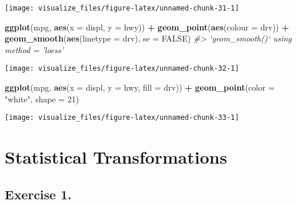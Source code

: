 \documentclass[]{book}
\newenvironment{Shaded}{\begin{snugshade}}{\end{snugshade}}
\newcommand{\CommentTok}[1]{\textcolor[rgb]{0.56,0.35,0.01}{\textit{#1}}}
\newcommand{\DataTypeTok}[1]{\textcolor[rgb]{0.13,0.29,0.53}{#1}}
\newcommand{\DecValTok}[1]{\textcolor[rgb]{0.00,0.00,0.81}{#1}}
\newcommand{\KeywordTok}[1]{\textcolor[rgb]{0.13,0.29,0.53}{\textbf{#1}}}
\newcommand{\NormalTok}[1]{#1}
\newcommand{\OperatorTok}[1]{\textcolor[rgb]{0.81,0.36,0.00}{\textbf{#1}}}
\newcommand{\OtherTok}[1]{\textcolor[rgb]{0.56,0.35,0.01}{#1}}
\newcommand{\StringTok}[1]{\textcolor[rgb]{0.31,0.60,0.02}{#1}}
\theoremstyle{definition}
\theoremstyle{definition}
\theoremstyle{definition}
\theoremstyle{remark}
\begin{document}
\begin{center}\texttt{[image: visualize\_files/figure-latex/unnamed-chunk-31-1]} \end{center}

\begin{Shaded}
\begin{Highlighting}[]
\KeywordTok{ggplot}\NormalTok{(mpg, }\KeywordTok{aes}\NormalTok{(}\DataTypeTok{x =}\NormalTok{ displ, }\DataTypeTok{y =}\NormalTok{ hwy)) }\OperatorTok{+}
\StringTok{  }\KeywordTok{geom_point}\NormalTok{(}\KeywordTok{aes}\NormalTok{(}\DataTypeTok{colour =}\NormalTok{ drv)) }\OperatorTok{+}
\StringTok{  }\KeywordTok{geom_smooth}\NormalTok{(}\KeywordTok{aes}\NormalTok{(}\DataTypeTok{linetype =}\NormalTok{ drv), }\DataTypeTok{se =} \OtherTok{FALSE}\NormalTok{)}
\CommentTok{#> `geom_smooth()` using method = 'loess'}
\end{Highlighting}
\end{Shaded}

\begin{center}\texttt{[image: visualize\_files/figure-latex/unnamed-chunk-32-1]} \end{center}

\begin{Shaded}
\begin{Highlighting}[]
\KeywordTok{ggplot}\NormalTok{(mpg, }\KeywordTok{aes}\NormalTok{(}\DataTypeTok{x =}\NormalTok{ displ, }\DataTypeTok{y =}\NormalTok{ hwy, }\DataTypeTok{fill =}\NormalTok{ drv)) }\OperatorTok{+}
\StringTok{  }\KeywordTok{geom_point}\NormalTok{(}\DataTypeTok{color =} \StringTok{"white"}\NormalTok{, }\DataTypeTok{shape =} \DecValTok{21}\NormalTok{)}
\end{Highlighting}
\end{Shaded}

\begin{center}\texttt{[image: visualize\_files/figure-latex/unnamed-chunk-33-1]} \end{center}

\hypertarget{statistical-transformations}{%
\section{Statistical
Transformations}\label{statistical-transformations}}

\hypertarget{exercise-1.-4}{%
\subsection{Exercise 1.}\label{exercise-1.-4}}
\end{document}
